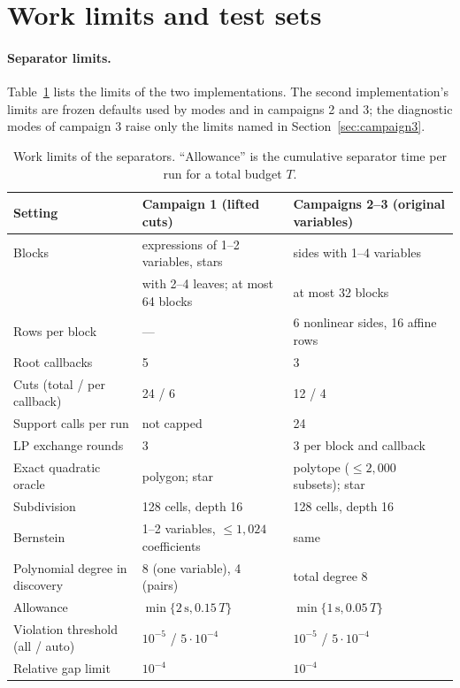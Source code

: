 \section{Work limits and test sets}\label{app:software}\label{app:instances}

\paragraph{Separator limits.}
Table~\ref{tab:limits} lists the limits of the two implementations. The
second implementation's limits are frozen defaults used by modes
 and  in campaigns 2 and 3; the diagnostic modes of
campaign 3 raise only the limits named in Section~\ref{sec:campaign3}.

\begin{table}[ht]
\centering\small
\caption{Work limits of the separators. ``Allowance'' is the cumulative
separator time per run for a total budget $T$.}\label{tab:limits}
\begin{tabular}{@{}lll@{}}
\toprule
Setting & Campaign 1 (lifted cuts) & Campaigns 2--3 (original variables)\\
\midrule
Blocks & expressions of 1--2 variables, stars & sides with 1--4 variables\\
       & with 2--4 leaves; at most 64 blocks & at most 32 blocks\\
Rows per block & --- & 6 nonlinear sides, 16 affine rows\\
Root callbacks & 5 & 3\\
Cuts (total / per callback) & 24 / 6 & 12 / 4\\
Support calls per run & not capped & 24\\
LP exchange rounds & 3 & 3 per block and callback\\
Exact quadratic oracle & polygon; star & polytope ($\le2{,}000$ subsets); star\\
Subdivision & 128 cells, depth 16 & 128 cells, depth 16\\
Bernstein & 1--2 variables, $\le1{,}024$ coefficients & same\\
Polynomial degree in discovery & 8 (one variable), 4 (pairs) & total degree 8\\
Allowance & $\min\{2\,\mathrm s,0.15\,T\}$ & $\min\{1\,\mathrm s,0.05\,T\}$\\
Violation threshold (all / auto) & $10^{-5}$ / $5\cdot10^{-4}$ & $10^{-5}$ / $5\cdot10^{-4}$\\
Relative gap limit & $10^{-4}$ & $10^{-4}$\\
\bottomrule
\end{tabular}
\end{table}

